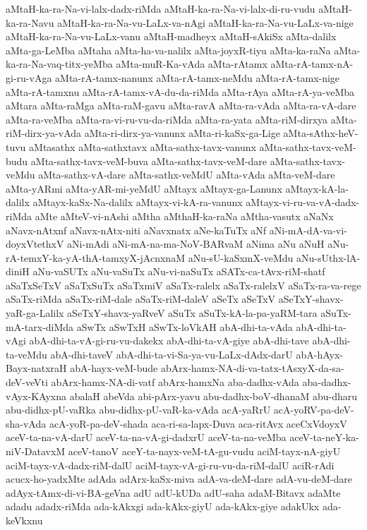 {aMtaH-ka-ra-Na-vi-lalx-dadx-riMda
aMtaH-ka-ra-Na-vi-lalx-di-ru-vudu
aMtaH-ka-ra-Navu
aMtaH-ka-ra-Na-vu-LaLx-va-nAgi
aMtaH-ka-ra-Na-vu-LaLx-va-nige
aMtaH-ka-ra-Na-vu-LaLx-vanu
aMtaH-madheyx
aMtaH-sAkiSx
aMta-dalilx
aMta-ga-LeMba
aMtaha
aMta-ha-va-nalilx
aMta-joyxR-tiyu
aMta-ka-raNa
aMta-ka-ra-Na-vaq-titx-yeMba
aMta-muR-Ka-vAda
aMta-rAtamx
aMta-rA-tamx-nA-gi-ru-vAga
aMta-rA-tamx-nanunx
aMta-rA-tamx-neMdu
aMta-rA-tamx-nige
aMta-rA-tamxnu
aMta-rA-tamx-vA-du-da-riMda
aMta-rAya
aMta-rA-ya-veMba
aMtara
aMta-raMga
aMta-raM-gavu
aMta-ravA
aMta-ra-vAda
aMta-ra-vA-dare
aMta-ra-veMba
aMta-ra-vi-ru-vu-da-riMda
aMta-ra-yata
aMta-riM-dirxya
aMta-riM-dirx-ya-vAda
aMta-ri-dirx-ya-vanunx
aMta-ri-kaSx-ga-Lige
aMta-sAthx-heV-tuvu
aMtasathx
aMta-sathxtavx
aMta-sathx-tavx-vanunx
aMta-sathx-tavx-veM-budu
aMta-sathx-tavx-veM-buva
aMta-sathx-tavx-veM-dare
aMta-sathx-tavx-veMdu
aMta-sathx-vA-dare
aMta-sathx-veMdU
aMta-vAda
aMta-veM-dare
aMta-yARmi
aMta-yAR-mi-yeMdU
aMtayx
aMtayx-ga-Lanunx
aMtayx-kA-la-dalilx
aMtayx-kaSx-Na-dalilx
aMtayx-vi-kA-ra-vanunx
aMtayx-vi-ru-va-vA-dadx-riMda
aMte
aMteV-vi-nAshi
aMtha
aMthaH-ka-raNa
aMtha-vasutx
aNaNx
aNavx-nAtxnf
aNavx-nAtx-niti
aNavxnatx
aNe-kaTuTx
aNf
aNi-mA-dA-va-vi-doyxVtethxV
aNi-mAdi
aNi-mA-na-ma-NoV-BARvaM
aNima
aNu
aNuH
aNu-rA-temxY-ka-yA-thA-tamxyX-jAcnxnaM
aNu-sU-kaSxmX-veMdu
aNu-sUthx-lA-diniH
aNu-vaSUTx
aNu-vaSuTx
aNu-vi-naSuTx
aSATx-ca-tAvx-riM-shatf
aSaTxSeTxV
aSaTxSuTx
aSaTxmiV
aSaTx-ralelx
aSaTx-ralelxV
aSaTx-ra-va-rege
aSaTx-riMda
aSaTx-riM-dale
aSaTx-riM-daleV
aSeTx
aSeTxV
aSeTxY-shavx-yaR-ga-Lalilx
aSeTxY-shavx-yaRveV
aSuTx
aSuTx-kA-la-pa-yaRM-tara
aSuTx-mA-tarx-diMda
aSwTx
aSwTxH
aSwTx-loVkAH
abA-dhi-ta-vAda
abA-dhi-ta-vAgi
abA-dhi-ta-vA-gi-ru-vu-dakekx
abA-dhi-ta-vA-giye
abA-dhi-tave
abA-dhi-ta-veMdu
abA-dhi-taveV
abA-dhi-ta-vi-Sa-ya-vu-LaLx-dAdx-darU
abA-hAyx-Bayx-natxraH
abA-hayx-veM-bude
abArx-hamx-NA-di-va-tatx-tAsxyX-da-sa-deV-veVti
abArx-hamx-NA-di-vatf
abArx-hamxNa
aba-dadhx-vAda
aba-dadhx-vAyx-KAyxna
abalaH
abeVda
abi-pArx-yavu
abu-dadhx-boV-dhanaM
abu-dharu
abu-didhx-pU-vaRka
abu-didhx-pU-vaR-ka-vAda
acA-yaRrU
acA-yoRV-pa-deV-sha-vAda
acA-yoR-pa-deV-shada
aca-ri-sa-lapx-Duva
aca-ritAvx
aceCxVdoyxV
aceV-ta-na-vA-darU
aceV-ta-na-vA-gi-dadxrU
aceV-ta-na-veMba
aceV-ta-neY-ka-niV-DatavxM
aceV-tanoV
aceY-ta-nayx-veM-tA-gu-vudu
aciM-tayx-nA-giyU
aciM-tayx-vA-dadx-riM-dalU
aciM-tayx-vA-gi-ru-vu-da-riM-dalU
aciR-rAdi
acucx-ho-yadxMte
adAda
adArx-kaSx-miva
adA-va-deM-dare
adA-vu-deM-dare
adAyx-tAmx-di-vi-BA-geVna
adU
adU-kUDa
adU-saha
adaM-Bitavx
adaMte
adadu
adadx-riMda
ada-kAkxgi
ada-kAkx-giyU
ada-kAkx-giye
adakUkx
ada-keVkxnu
}
